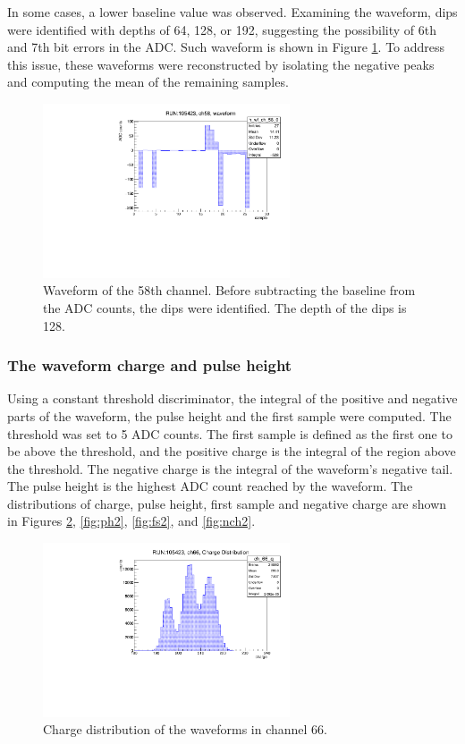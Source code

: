 In some cases, a lower baseline value was observed. Examining the waveform, dips were identified with depths of 64, 128, or 192, 
suggesting the possibility of 6th and 7th bit errors in the ADC. Such waveform is shown in Figure \ref{fig:dips}. 
To address this issue, these waveforms were reconstructed by isolating the negative peaks and computing the mean of the remaining samples.
\begin{figure}[!h]
  \centering
  \includegraphics[width=0.65\textwidth]{figures/pdf/wf_ch58_1.pdf}
  \caption{Waveform of the 58th channel. Before subtracting the baseline from the ADC counts, the dips were identified. The depth of the dips is 128.}
 \label{fig:dips}
\end{figure}
\subsubsection{The waveform charge and pulse height}\label{threshold}
Using a constant threshold discriminator, the integral of the positive and negative parts of the waveform, 
the pulse height and the first sample were computed. The threshold was set to 5 ADC counts. 
The first sample is defined as the first one to be above the threshold, and the positive charge 
is the integral of the region above the threshold. The negative charge is the integral of the waveform's 
negative tail. The pulse height is the highest ADC count reached by the waveform. The distributions of 
charge, pulse height, first sample and negative charge are shown in Figures \ref{fig:ch1}, \ref{fig:ph2}, \ref{fig:fs2}, and \ref{fig:nch2}.

\begin{figure}[!h]
      \centering
      \includegraphics[width=0.65\textwidth]{figures/pdf/charge.pdf}
      \caption{Charge distribution of the waveforms in channel 66.}
      \label{fig:ch1}
  \end{figure}

